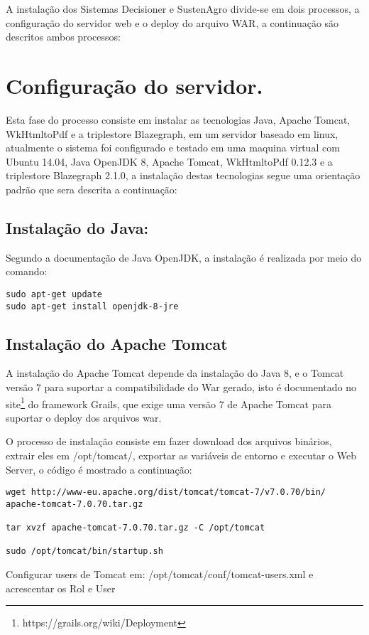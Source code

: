 A instalação dos Sistemas Decisioner e SustenAgro divide-se em dois
processos, a configuração do servidor web e o deploy do arquivo WAR,
a continuação são descritos ambos processos:

\section{Configuração do servidor.}

Esta fase do processo consiste em instalar as tecnologias Java, Apache
Tomcat, WkHtmltoPdf e a triplestore Blazegraph, em um servidor baseado
em linux, atualmente o sistema foi configurado e testado em uma maquina
virtual com Ubuntu 14.04, Java OpenJDK 8, Apache Tomcat, WkHtmltoPdf
0.12.3 e a triplestore Blazegraph 2.1.0, a instalação destas tecnologias
segue uma orientação padrão que sera descrita a continuação:

\subsection{Instalação do Java:}

Segundo a documentação de Java OpenJDK, a instalação é realizada por
meio do comando:

\begin{lstlisting}
sudo apt-get update
sudo apt-get install openjdk-8-jre
\end{lstlisting}

\subsection{Instalação do Apache Tomcat}

A instalação do Apache Tomcat depende da instalação do Java 8, e o
Tomcat versão 7 para suportar a compatibilidade do War gerado, isto
é documentado no site\footnote{https://grails.org/wiki/Deployment}
do framework Grails, que exige uma versão 7 de Apache Tomcat para
suportar o deploy dos arquivos war.

O processo de instalação consiste em fazer download dos arquivos binários,
extrair eles em /opt/tomcat/, exportar as variáveis de entorno e executar
o Web Server, o código é mostrado a continuação:

\begin{lstlisting}
wget http://www-eu.apache.org/dist/tomcat/tomcat-7/v7.0.70/bin/
apache-tomcat-7.0.70.tar.gz

tar xvzf apache-tomcat-7.0.70.tar.gz -C /opt/tomcat

sudo /opt/tomcat/bin/startup.sh
\end{lstlisting}
Configurar users de Tomcat em: /opt/tomcat/conf/tomcat-users.xml e
acrescentar os Rol e User

